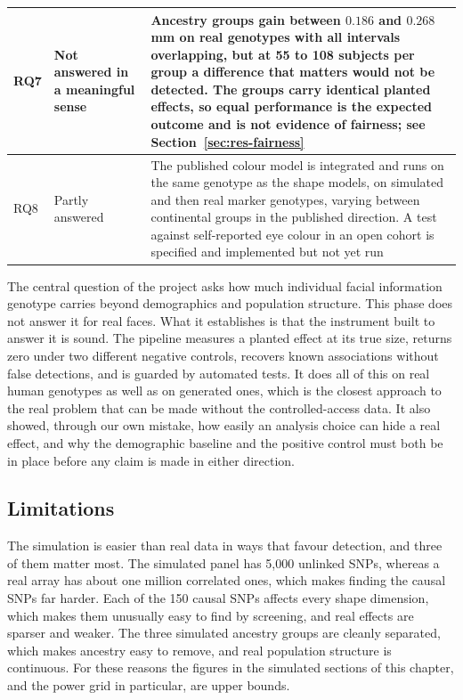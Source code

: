 \begin{table}[!ht]
\begin{tabular}{|P{1.1cm}|P{2.6cm}|P{10.6cm}|}
RQ7 & Not answered in a meaningful sense & Ancestry groups gain between $0.186$ and $0.268$ mm on real genotypes with all intervals overlapping, but at 55 to 108 subjects per group a difference that matters would not be detected. The groups carry identical planted effects, so equal performance is the expected outcome and is not evidence of fairness; see Section~\ref{sec:res-fairness} \\ \hline
RQ8 & Partly answered & The published colour model is integrated and runs on the same genotype as the shape models, on simulated and then real marker genotypes, varying between continental groups in the published direction. A test against self-reported eye colour in an open cohort is specified and implemented but not yet run \\ \hline
\end{tabular}
\end{table}

The central question of the project asks how much individual facial information genotype carries beyond demographics and population structure. This phase does not answer it for real faces. What it establishes is that the instrument built to answer it is sound. The pipeline measures a planted effect at its true size, returns zero under two different negative controls, recovers known associations without false detections, and is guarded by automated tests. It does all of this on real human genotypes as well as on generated ones, which is the closest approach to the real problem that can be made without the controlled-access data. It also showed, through our own mistake, how easily an analysis choice can hide a real effect, and why the demographic baseline and the positive control must both be in place before any claim is made in either direction.

\subsection{Limitations}
\label{sec:res-limits}
The simulation is easier than real data in ways that favour detection, and three of them matter most. The simulated panel has 5{,}000 unlinked SNPs, whereas a real array has about one million correlated ones, which makes finding the causal SNPs far harder. Each of the 150 causal SNPs affects every shape dimension, which makes them unusually easy to find by screening, and real effects are sparser and weaker. The three simulated ancestry groups are cleanly separated, which makes ancestry easy to remove, and real population structure is continuous. For these reasons the figures in the simulated sections of this chapter, and the power grid in particular, are upper bounds.

